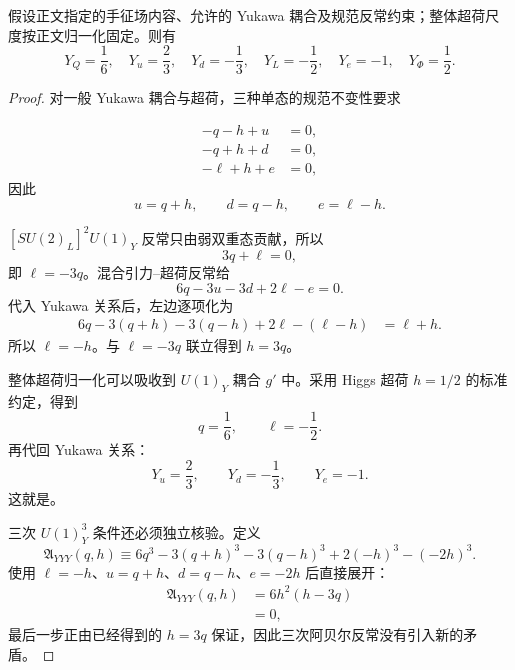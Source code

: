 \begin{proposition}[超荷线性与立方约束的解]
假设正文指定的手征场内容、允许的 Yukawa 耦合及规范反常约束；整体超荷尺度按正文归一化固定。则有
\begin{equation}
 {
 Y_Q=\frac16,\quad Y_u=\frac23,\quad Y_d=-\frac13,\quad
 Y_L=-\frac12,\quad Y_e=-1,\quad Y_\Phi=\frac12.}
\label{eq:sm-hypercharge-solution-dp32}
\end{equation}
\end{proposition}
\begin{proof}
对一般 Yukawa 耦合与超荷，三种单态的规范不变性要求

\begin{align*}
 -q-h+u&=0,\\
 -q+h+d&=0,\\
 -\ell+h+e&=0,
\end{align*}
因此
\begin{equation*}
 u=q+h,\qquad d=q-h,\qquad e=\ell-h.
\end{equation*}

$[SU(2)_L]^2U(1)_Y$ 反常只由弱双重态贡献，所以
\begin{equation*}
 3q+\ell=0,
\end{equation*}
即 $\ell=-3q$。混合引力--超荷反常给
\begin{equation*}
 6q-3u-3d+2\ell-e=0.
\end{equation*}
代入 Yukawa 关系后，左边逐项化为
\begin{align*}
 6q-3(q+h)-3(q-h)+2\ell-(\ell-h)
 &=\ell+h.
\end{align*}
所以 $\ell=-h$。与 $\ell=-3q$ 联立得到 $h=3q$。

整体超荷归一化可以吸收到 $U(1)_Y$ 耦合 $g'$ 中。采用 Higgs 超荷 $h=1/2$ 的标准约定，得到
\begin{equation*}
 q=\frac16,\qquad \ell=-\frac12.
\end{equation*}
再代回 Yukawa 关系：
\begin{equation*}
 Y_u=\frac23,\qquad
 Y_d=-\frac13,\qquad
 Y_e=-1.
\end{equation*}
这就是。

三次 $U(1)_Y^3$ 条件还必须独立核验。定义
\begin{equation*}
 \mathfrak A_{YYY}(q,h)
 \equiv
 6q^3-3(q+h)^3-3(q-h)^3+2(-h)^3-(-2h)^3.
\end{equation*}
使用 $\ell=-h$、$u=q+h$、$d=q-h$、$e=-2h$ 后直接展开：
\begin{align*}
 \mathfrak A_{YYY}(q,h)
 &=6h^2(h-3q)\\
 &=0,
\end{align*}
最后一步正由已经得到的 $h=3q$ 保证，因此三次阿贝尔反常没有引入新的矛盾。
\end{proof}

